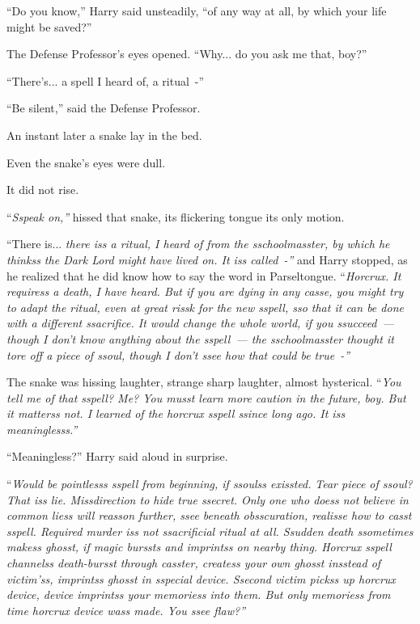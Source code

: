 ``Do you know,'' Harry said unsteadily, ``of any way at all, by which your life might be saved?''

The Defense Professor's eyes opened. ``Why... do you ask me that, boy?''

``There's... a spell I heard of, a ritual~-''

``Be silent,'' said the Defense Professor.

An instant later a snake lay in the bed.

Even the snake's eyes were dull.

It did not rise.

``\emph{Sspeak on,''} hissed that snake, its flickering tongue its only motion.

``There is... \emph{there iss a ritual, I heard of from the sschoolmasster, by which he thinkss the Dark Lord might have lived on. It iss called~-''} and Harry stopped, as he realized that he did know how to say the word in Parseltongue. ``\emph{Horcrux. It requiress a death, I have heard. But if you are dying in any casse, you might try to adapt the ritual, even at great rissk for the new sspell, sso that it can be done with a different ssacrifice. It would change the whole world, if you ssucceed~--- though I don't know anything about the sspell~--- the sschoolmasster thought it tore off a piece of ssoul, though I don't ssee how that could be true~-''}

The snake was hissing laughter, strange sharp laughter, almost hysterical. ``\emph{You tell me of that sspell? Me? You musst learn more caution in the future, boy. But it matterss not. I learned of the horcrux sspell ssince long ago. It iss meaninglesss.''}

``Meaningless?'' Harry said aloud in surprise.

``\emph{Would be pointlesss sspell from beginning, if ssoulss exissted.} \emph{Tear piece of ssoul? That iss lie. Missdirection to hide true ssecret. Only one who doess not believe in common liess will reasson further, ssee beneath obsscuration, realisse how to casst sspell. Required murder iss not ssacrificial ritual at all. Ssudden death ssometimes makess ghosst, if magic burssts and imprintss on nearby thing. Horcrux sspell channelss death-bursst through casster, createss your own ghosst insstead of victim'ss, imprintss ghosst in sspecial device. Ssecond victim pickss up horcrux device, device imprintss your memoriess into them. But only memoriess from time horcrux device wass made. You ssee flaw?''}

